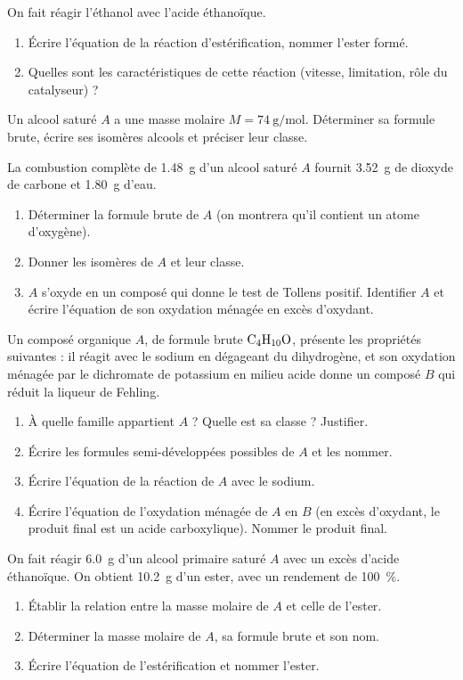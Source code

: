 \exo{} On fait réagir l'éthanol avec l'acide éthanoïque.
\begin{enumerate}[label=\arabic*)]
\item Écrire l'équation de la réaction d'estérification, nommer l'ester formé.
\item Quelles sont les caractéristiques de cette réaction (vitesse, limitation,
rôle du catalyseur) ?
\end{enumerate}


\exo{} Un alcool saturé $A$ a une masse molaire $M = \SI{74}{\gram\per\mol}$.
Déterminer sa formule brute, écrire ses isomères alcools et préciser leur classe.

\exo{} La combustion complète de \SI{1.48}{\gram} d'un alcool saturé $A$
fournit \SI{3.52}{\gram} de dioxyde de carbone et \SI{1.80}{\gram} d'eau.
\begin{enumerate}[label=\arabic*)]
\item Déterminer la formule brute de $A$ (on montrera qu'il contient un atome d'oxygène).
\item Donner les isomères de $A$ et leur classe.
\item $A$ s'oxyde en un composé qui donne le test de Tollens positif. Identifier $A$
et écrire l'équation de son oxydation ménagée en excès d'oxydant.
\end{enumerate}


Un composé organique $A$, de formule brute $\ce{C4H10O}$, présente les propriétés
suivantes : il réagit avec le sodium en dégageant du dihydrogène, et son oxydation
ménagée par le dichromate de potassium en milieu acide donne un composé $B$ qui
réduit la liqueur de Fehling.
\begin{enumerate}[label=\arabic*)]
\item À quelle famille appartient $A$ ? Quelle est sa classe ? Justifier.
\item Écrire les formules semi-développées possibles de $A$ et les nommer.
\item Écrire l'équation de la réaction de $A$ avec le sodium.
\item Écrire l'équation de l'oxydation ménagée de $A$ en $B$ (en excès d'oxydant,
le produit final est un acide carboxylique). Nommer le produit final.
\end{enumerate}

On fait réagir \SI{6.0}{\gram} d'un alcool primaire saturé $A$ avec un excès d'acide
éthanoïque. On obtient \SI{10.2}{\gram} d'un ester, avec un rendement de \SI{100}{\percent}.
\begin{enumerate}[label=\arabic*)]
\item Établir la relation entre la masse molaire de $A$ et celle de l'ester.
\item Déterminer la masse molaire de $A$, sa formule brute et son nom.
\item Écrire l'équation de l'estérification et nommer l'ester.
\end{enumerate}
